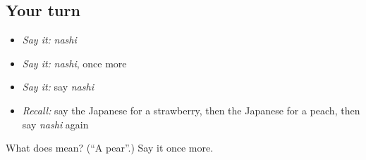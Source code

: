 \subsection*{Your turn}
\begin{itemize}
\raggedright
  \item \emph{Say it:} \emph{nashi}
  \item \emph{Say it:} \emph{nashi}, once more
  \item \emph{Say it:} say \emph{nashi}
  \item \emph{Recall:} say the Japanese for a strawberry, then the Japanese for a peach, then say \emph{nashi} again
\end{itemize}

\begin{tcolorbox}[breakable,colback=teal!4,colframe=teal!35!black,title={Before you move on}]
What does  mean? (\textquotedblleft{}A pear\textquotedblright{}.) Say it once more.
\end{tcolorbox}
